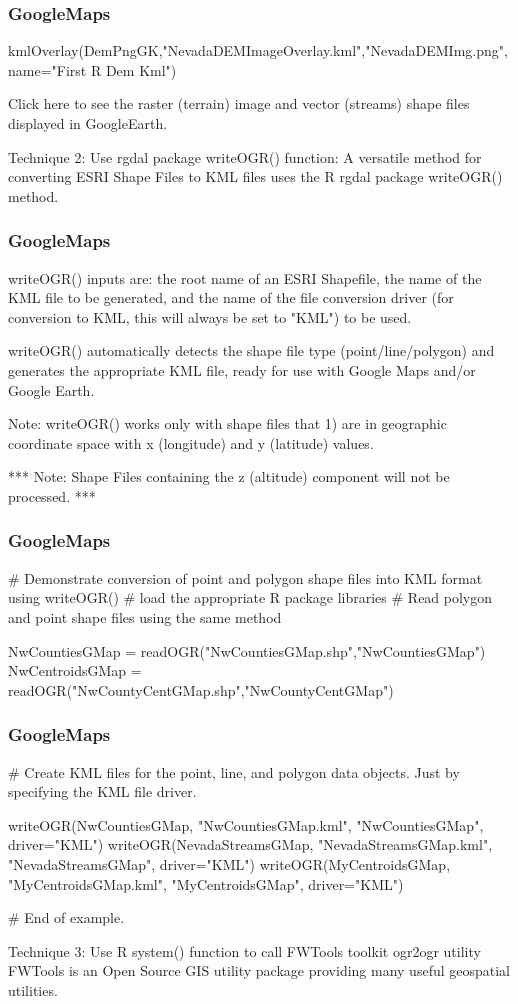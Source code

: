 \documentclass{beamer}
\begin{document}
\begin{frame}[fragile]
\frametitle{GoogleMaps}
   kmlOverlay(DemPngGK,"NevadaDEMImageOverlay.kml","NevadaDEMImg.png",name="First R Dem Kml")  

Click here to see the raster (terrain) image and vector (streams) shape files displayed in GoogleEarth.

Technique 2: Use rgdal package writeOGR() function:
A versatile method for converting ESRI Shape Files to KML files uses the R rgdal package writeOGR() method.
\end{frame}
\begin{frame}[fragile]
\frametitle{GoogleMaps}

writeOGR() inputs are: the root name of an ESRI Shapefile, the name of the KML file to be generated, and the name of the file conversion driver (for conversion to KML, this will always be set to "KML") to be used.

writeOGR() automatically detects the shape file type (point/line/polygon) and generates the appropriate KML file, ready for use with Google Maps and/or Google Earth.

Note: writeOGR() works only with shape files that 1) are in geographic coordinate space with x (longitude) and y (latitude) values.

*** Note: Shape Files containing the z (altitude) component will not be processed. ***
\end{frame}
\begin{frame}[fragile]
\frametitle{GoogleMaps}

        
# Demonstrate conversion of point and polygon shape files into KML format using writeOGR()
# load the appropriate R package libraries
# Read polygon and point shape files using the same method

   NwCountiesGMap = readOGR("NwCountiesGMap.shp","NwCountiesGMap")
   NwCentroidsGMap = readOGR("NwCountyCentGMap.shp","NwCountyCentGMap")

\end{frame}
\begin{frame}[fragile]
\frametitle{GoogleMaps}


# Create KML files for the point, line, and polygon data objects. Just by specifying the KML file driver.

  writeOGR(NwCountiesGMap, "NwCountiesGMap.kml", "NwCountiesGMap", driver="KML")  
  writeOGR(NevadaStreamsGMap, "NevadaStreamsGMap.kml", "NevadaStreamsGMap", driver="KML")
  writeOGR(MyCentroidsGMap, "MyCentroidsGMap.kml", "MyCentroidsGMap", driver="KML")   

# End of example.

Technique 3: Use R system() function to call FWTools toolkit ogr2ogr utility
FWTools is an Open Source GIS utility package providing many useful geospatial utilities.
\end{frame}
\end{document}
